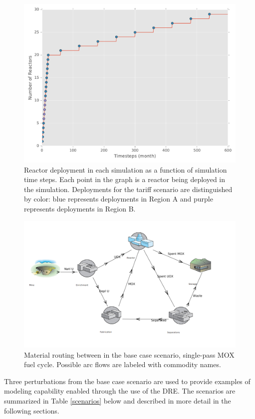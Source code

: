 \begin{figure}
  \begin{center}
    \includegraphics[width=0.75\columnwidth]{rxtr_deploy.pdf}
    \caption[]{
      \label{fig:deploy}
      Reactor deployment in each simulation as a function of simulation time
      steps. Each point in the graph is a reactor being deployed in the
      simulation. Deployments for the tariff scenario are distinguished by
      color: blue represents deployments in Region A and purple represents
      deployments in Region B.}
  \end{center}
\end{figure}

\begin{figure}
  \begin{center}
    \includegraphics[width=0.75\columnwidth]{base_case_fc}
    \caption[]{
      \label{fig:base}
      Material routing between in the base case scenario, single-pass MOX fuel
      cycle. Possible arc flows are labeled with commodity names.}
  \end{center}
\end{figure}

Three perturbations from the base case scenario are used to provide examples of
modeling capability enabled through the use of the DRE. The scenarios are
summarized in Table \ref{scenarios} below and described in more detail in the
following sections. 

